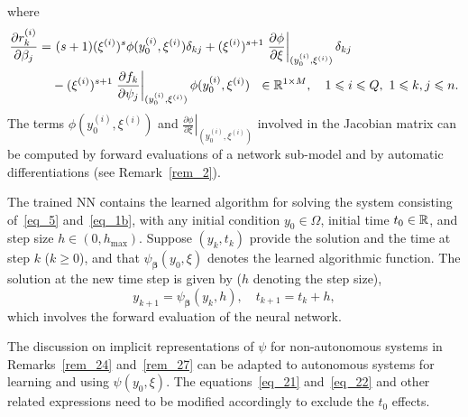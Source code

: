 where
\begin{equation}
  \begin{split}
  \frac{\partial r^{(i)}_k}{\partial\beta_j}
  =&\ (s+1)(\xi^{(i)})^s\phi(y_0^{(i)},\xi^{(i)})\delta_{kj}
  + (\xi^{(i)})^{s+1}\left.\frac{\partial\phi}{\partial\xi} \right|_{(y_0^{(i)},\xi^{(i)})} \delta_{kj} \\
  & - (\xi^{(i)})^{s+1} \left.\frac{\partial f_k}{\partial\psi_j} \right|_{(y_0^{(i)},\xi^{(i)})} \phi(y_0^{(i)},\xi^{(i)})
  \ \ \in\mathbb{R}^{1\times M},
  \quad 1\leqslant i\leqslant Q, \ 1\leqslant k, j\leqslant n.
  \end{split}
\end{equation}
%
The terms $\phi(y_0^{(i)},\xi^{(i)})$ and
$\left.\frac{\partial\phi}{\partial\xi} \right|_{(y_0^{(i)},\xi^{(i)})}$
involved in the Jacobian matrix can be computed
by forward evaluations of a network sub-model  and
by automatic differentiations (see Remark~\ref{rem_2}).


The trained NN  contains the learned algorithm for
solving the system consisting of~\eqref{eq_5} and~\eqref{eq_1b},
with any initial condition $y_0\in\Omega$, initial time $t_0\in\mathbb{R}$, and
step size $h\in(0,h_{\max})$.
Suppose $(y_k,t_k)$ provide the solution and the time
at step $k$ ($k\geqslant 0$),
and that $\psi_{\bm\beta}(y_0,\xi)$ denotes the learned algorithmic function. 
The solution at the new time step is given by ($h$ denoting the step size),
\begin{equation}\label{eq_41}
  y_{k+1} = \psi_{\bm\beta}(y_k,h),
  \quad t_{k+1} = t_k+h,
\end{equation}
which involves the forward evaluation of the neural network.



\begin{remark}
  The discussion on implicit representations of $\psi$
  for non-autonomous systems in Remarks~\ref{rem_24} and~\ref{rem_27}
  can be adapted to autonomous
  systems for learning and using $\psi(y_0,\xi)$.
  The equations~\eqref{eq_21}
  and~\eqref{eq_22} and other related expressions
  need to be modified accordingly to exclude the $t_0$ effects.
  

\end{remark}





